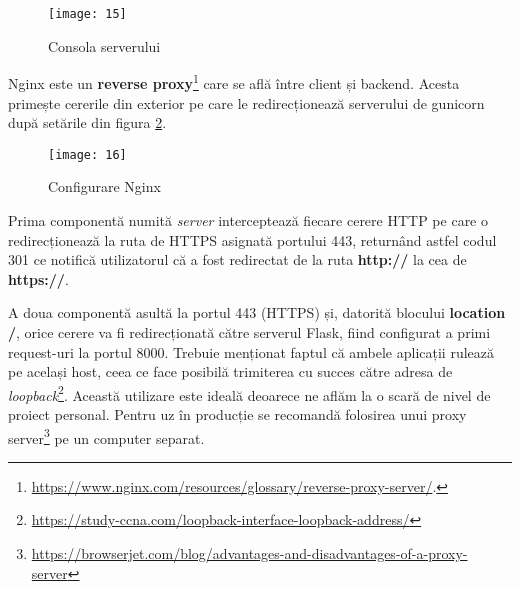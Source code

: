 \begin{figure}[h]
	\centering
	\texttt{[image: 15]}
	\caption{Consola serverului}
	\label{fig:15}
\end{figure}

Nginx este un \textbf{reverse proxy}\footnote{\url{https://www.nginx.com/resources/glossary/reverse-proxy-server/}.} care se află între client și backend. Acesta primește cererile din exterior pe care le redirecționează serverului de gunicorn după setările din figura \ref{fig:16}.

\begin{figure}[h]
	\centering
	\texttt{[image: 16]}
	\caption{Configurare Nginx}
	\label{fig:16}
\end{figure}

Prima componentă numită \emph{server} interceptează fiecare cerere HTTP pe care o redirecționează la ruta de HTTPS asignată portului 443, returnând astfel codul 301 ce notifică utilizatorul că a fost redirectat de la ruta \textbf{http://} la cea de \textbf{https://}.

A doua componentă asultă la portul 443 (HTTPS) și, datorită blocului \textbf{location /}, orice cerere va fi redirecționată către serverul Flask, fiind configurat a primi request-uri la portul 8000. Trebuie menționat faptul că ambele aplicații rulează pe același host, ceea ce face posibilă trimiterea cu succes către adresa de \emph{loopback}\footnote{\url{https://study-ccna.com/loopback-interface-loopback-address/}}. Această utilizare este ideală deoarece ne aflăm la o scară de nivel de proiect personal. Pentru uz în producție se recomandă folosirea unui proxy server\footnote{\url{https://browserjet.com/blog/advantages-and-disadvantages-of-a-proxy-server}} pe un computer separat.

